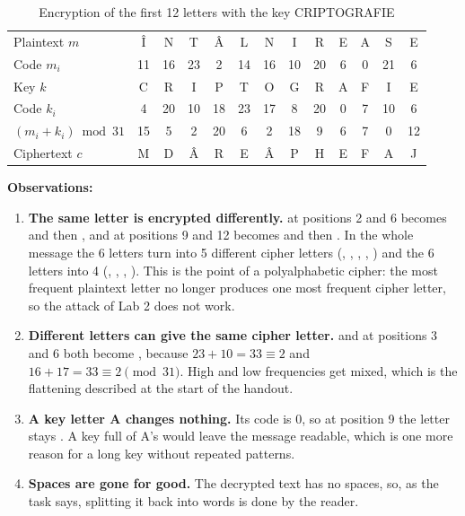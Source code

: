 \documentclass[11pt,a4paper]{article}
\begin{document}
\begin{table}[H]
\centering
\caption{Encryption of the first 12 letters with the key CRIPTOGRAFIE}\label{tab:hand}
\setlength{\tabcolsep}{4.2pt}
\small
\begin{tabular}{l*{12}{c}}
\toprule
Plaintext $m$ & Î & N & T & Â & L & N & I & R & E & A & S & E \\
Code $m_i$ & 11 & 16 & 23 & 2 & 14 & 16 & 10 & 20 & 6 & 0 & 21 & 6 \\
Key $k$ & C & R & I & P & T & O & G & R & A & F & I & E \\
Code $k_i$ & 4 & 20 & 10 & 18 & 23 & 17 & 8 & 20 & 0 & 7 & 10 & 6 \\
$(m_i + k_i) \bmod 31$ & 15 & 5 & 2 & 20 & 6 & 2 & 18 & 9 & 6 & 7 & 0 & 12 \\
Ciphertext $c$ & M & D & Â & R & E & Â & P & H & E & F & A & J \\
\bottomrule
\end{tabular}
\end{table}

\textbf{Observations:}
\begin{enumerate}
  \item \textbf{The same letter is encrypted differently.}  at positions 2 and 6 becomes
   and then , and  at positions 9 and 12 becomes  and then
  . In the whole message the 6 letters  turn into 5 different cipher letters
  (, , , , ) and the 6 letters  into 4
  (, , , ). This is the point of a polyalphabetic cipher: the most
  frequent plaintext letter no longer produces one most frequent cipher letter, so the attack of
  Lab 2 does not work.
  \item \textbf{Different letters can give the same cipher letter.}  and  at
  positions 3 and 6 both become , because $23 + 10 = 33 \equiv 2$ and
  $16 + 17 = 33 \equiv 2 \pmod{31}$. High and low frequencies get mixed, which is the flattening
  described at the start of the handout.
  \item \textbf{A key letter A changes nothing.} Its code is 0, so at position 9 the letter
   stays . A key full of A's would leave the message readable, which is one more
  reason for a long key without repeated patterns.
  \item \textbf{Spaces are gone for good.} The decrypted text has no spaces, so, as the task
  says, splitting it back into words is done by the reader.
\end{enumerate}
\end{document}
